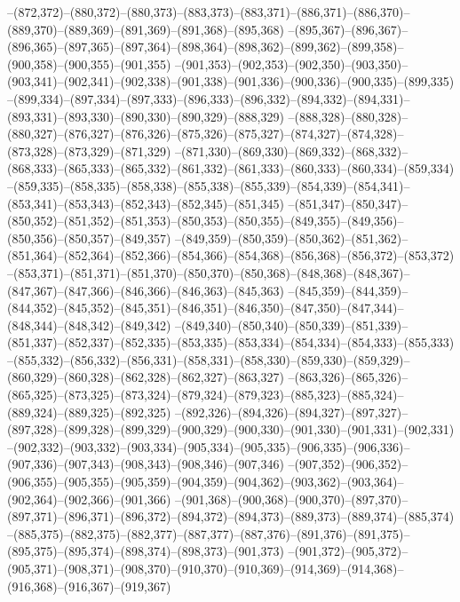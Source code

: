 --(872,372)--(880,372)--(880,373)--(883,373)--(883,371)--(886,371)--(886,370)--(889,370)--(889,369)--(891,369)--(891,368)--(895,368)
--(895,367)--(896,367)--(896,365)--(897,365)--(897,364)--(898,364)--(898,362)--(899,362)--(899,358)--(900,358)--(900,355)--(901,355)
--(901,353)--(902,353)--(902,350)--(903,350)--(903,341)--(902,341)--(902,338)--(901,338)--(901,336)--(900,336)--(900,335)--(899,335)
--(899,334)--(897,334)--(897,333)--(896,333)--(896,332)--(894,332)--(894,331)--(893,331)--(893,330)--(890,330)--(890,329)--(888,329)
--(888,328)--(880,328)--(880,327)--(876,327)--(876,326)--(875,326)--(875,327)--(874,327)--(874,328)--(873,328)--(873,329)--(871,329)
--(871,330)--(869,330)--(869,332)--(868,332)--(868,333)--(865,333)--(865,332)--(861,332)--(861,333)--(860,333)--(860,334)--(859,334)
--(859,335)--(858,335)--(858,338)--(855,338)--(855,339)--(854,339)--(854,341)--(853,341)--(853,343)--(852,343)--(852,345)--(851,345)
--(851,347)--(850,347)--(850,352)--(851,352)--(851,353)--(850,353)--(850,355)--(849,355)--(849,356)--(850,356)--(850,357)--(849,357)
--(849,359)--(850,359)--(850,362)--(851,362)--(851,364)--(852,364)--(852,366)--(854,366)--(854,368)--(856,368)--(856,372)--(853,372)
--(853,371)--(851,371)--(851,370)--(850,370)--(850,368)--(848,368)--(848,367)--(847,367)--(847,366)--(846,366)--(846,363)--(845,363)
--(845,359)--(844,359)--(844,352)--(845,352)--(845,351)--(846,351)--(846,350)--(847,350)--(847,344)--(848,344)--(848,342)--(849,342)
--(849,340)--(850,340)--(850,339)--(851,339)--(851,337)--(852,337)--(852,335)--(853,335)--(853,334)--(854,334)--(854,333)--(855,333)
--(855,332)--(856,332)--(856,331)--(858,331)--(858,330)--(859,330)--(859,329)--(860,329)--(860,328)--(862,328)--(862,327)--(863,327)
--(863,326)--(865,326)--(865,325)--(873,325)--(873,324)--(879,324)--(879,323)--(885,323)--(885,324)--(889,324)--(889,325)--(892,325)
--(892,326)--(894,326)--(894,327)--(897,327)--(897,328)--(899,328)--(899,329)--(900,329)--(900,330)--(901,330)--(901,331)--(902,331)
--(902,332)--(903,332)--(903,334)--(905,334)--(905,335)--(906,335)--(906,336)--(907,336)--(907,343)--(908,343)--(908,346)--(907,346)
--(907,352)--(906,352)--(906,355)--(905,355)--(905,359)--(904,359)--(904,362)--(903,362)--(903,364)--(902,364)--(902,366)--(901,366)
--(901,368)--(900,368)--(900,370)--(897,370)--(897,371)--(896,371)--(896,372)--(894,372)--(894,373)--(889,373)--(889,374)--(885,374)
--(885,375)--(882,375)--(882,377)--(887,377)--(887,376)--(891,376)--(891,375)--(895,375)--(895,374)--(898,374)--(898,373)--(901,373)
--(901,372)--(905,372)--(905,371)--(908,371)--(908,370)--(910,370)--(910,369)--(914,369)--(914,368)--(916,368)--(916,367)--(919,367)
